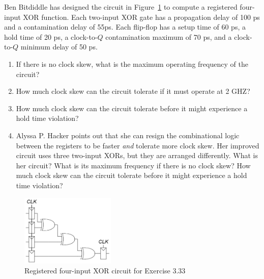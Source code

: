 \documentclass[12pt]{article}
\newenvironment{ex}[2][Exercise]{\begin{trivlist}
		\item[\hskip \labelsep {\bfseries #1}\hskip \labelsep {\bfseries #2.}]}{\end{trivlist}}
\begin{document}
\begin{ex}{3.33}
	Ben Bitdiddle has designed the circuit in Figure~\ref{03-33-circuit} to compute a registered
	four-input XOR function. Each two-input XOR gate has a propagation delay of
	100 ps and a contamination delay of 55ps. Each flip-flop has a setup time
	of 60 ps, a hold time of 20 ps, a clock-to-$Q$ contamination maximum of 70 ps,
	and a clock-to-$Q$ minimum delay of 50 ps.
	\begin{enumerate}[label=(\alph*)]
		\item If there is no clock skew, what is the maximum operating frequency
		of the circuit?
		\item How much clock skew can the circuit tolerate if it must operate at
		2 GHZ?
		\item How much clock skew can the circuit tolerate before it might experience
		a hold time violation?
		\item Alyssa P. Hacker points out that she can resign the combinational
		logic between the registers to be faster \emph{and} tolerate more clock
		skew. Her improved circuit uses three two-input XORs, but they are arranged
		differently. What is her circuit? What is its maximum frequency if there
		is no clock skew? How much clock skew can the circuit tolerate before it might
		experience a hold time violation?
	\end{enumerate}
	\begin{figure}
		\centering
		\includegraphics[width=0.4\textwidth]{03-33-circuit}
		\caption{Registered four-input XOR circuit for Exercise 3.33}
		\label{03-33-circuit}
	\end{figure}
\end{ex}
\end{document}
